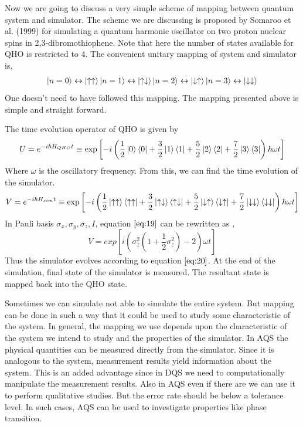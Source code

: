 \documentclass[12pt,a4paper]{report}
\begin{document}
Now we are going to discuss a very simple scheme of mapping between quantum system and simulator. The scheme we are discussing is proposed by Somaroo et al. (1999)\cite{somaroo} for simulating a quantum harmonic oscillator on two proton nuclear spins in 2,3-dibromothiophene. Note that here the number of states available for QHO is restricted to $4$. The convenient unitary mapping of system and simulator is,
\begin{gather*}
\ket{n=0} \leftrightarrow \ket{\uparrow\uparrow}
\ket{n=1} \leftrightarrow \ket{\uparrow\downarrow}
\ket{n=2} \leftrightarrow \ket{\downarrow\uparrow}
\ket{n=3} \leftrightarrow \ket{\downarrow\downarrow}
\end{gather*}
One doesn’t need to have followed this mapping. The mapping presented above is simple and straight forward. \par
The time evolution operator of QHO is given by
\begin{equation}
U = e^{-i\hbar H_{QHO} t} \equiv \exp\left[-i\left(\frac{1}{2}\ket{0}\bra{0} + \frac{3}{2}\ket{1}\bra{1} + \frac{5}{2}\ket{2}\bra{2} + \frac{7}{2}\ket{3}\bra{3}\right)\hbar\omega t\right]
\end{equation}
Where $\omega$ is the oscillatory frequency. From this, we can find the time evolution of the simulator.
\begin{equation}
\label{eq:19}
V = e^{-i\hbar H_{sim} t} \equiv \exp\left[-i\left(\frac{1}{2}\ket{\uparrow\uparrow}\bra{\uparrow\uparrow} + \frac{3}{2}\ket{\uparrow\downarrow}\bra{\uparrow\downarrow} + \frac{5}{2}\ket{\downarrow\uparrow}\bra{\downarrow\uparrow} + \frac{7}{2}\ket{\downarrow\downarrow}\bra{\downarrow\downarrow}\right)\hbar\omega t\right]
\end{equation}
In Pauli basis ${\sigma_{x},\sigma_{y},\sigma_{z},I}$, equation $\ref{eq:19}$ can be rewritten as ,
\begin{equation}
\label{eq:20}
V = exp\left[i\left(\sigma_{z}^{2}(1 + \frac{1}{2}\sigma_{z}^{2}) - 2 \right)\omega t\right]
\end{equation} 
Thus the simulator evolves according to equation $\ref{eq:20}$. At the end of the simulation, final state of the simulator is measured. The resultant state is mapped back into the QHO state.\par

Sometimes we can simulate not able to simulate the entire system. But mapping can be done in such a way that it could be used to study some characteristic of the system. In general, the mapping we use depends upon the characteristic of the system we intend to study and the properties of the simulator. In AQS the physical quantities can be measured directly from the simulator. Since it is analogous to the system, measurement results yield information about the system. This is an added advantage since in DQS we need to computationally manipulate the measurement results. Also in AQS even if there are we can use it to perform qualitative studies. But the error rate should be below a tolerance level. In such cases, AQS can be used to investigate properties like phase transition.  
 
\end{document}
